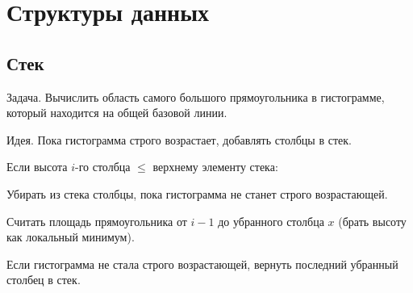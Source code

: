 \section{Структуры данных}

\subsection{Стек}

\begin{theorem}
{\bold Задача.} Вычислить область самого большого прямоугольника в гистограмме, который находится на общей базовой линии.
\end{theorem}

{\bold Идея.} Пока гистограмма {\ital строго возрастает}, добавлять столбцы в стек.

Если высота $i$-го столбца $\leq$ верхнему элементу стека:
\begin{list*}[][\#]
\item Убирать из стека столбцы, пока гистограмма не станет {\ital строго возрастающей}.
\item Считать площадь прямоугольника от $i-1$ до убранного столбца $x$ {\ital\color{desc}(брать высоту как локальный минимум)}.
\end{list*}
Если гистограмма {\ital не стала} строго возрастающей, {\ital  вернуть} последний убранный столбец в стек.
